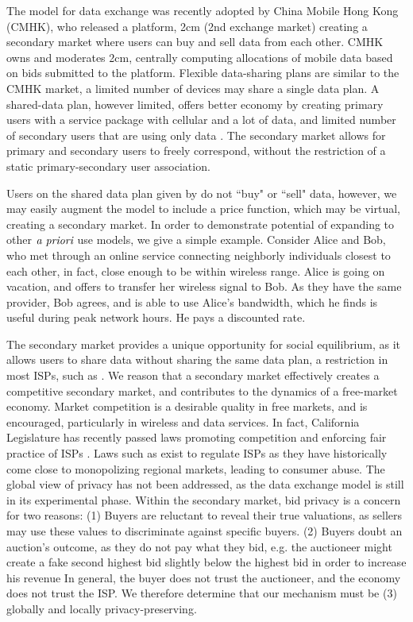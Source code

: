 The model for data exchange was recently adopted by China Mobile Hong Kong
(CMHK), who released a platform, 2cm (2nd exchange market) creating a secondary
market where users can buy and sell data from each other.
CMHK owns and moderates 2cm, centrally computing allocations of mobile data
based on bids submitted to the platform.
Flexible data-sharing
plans are similar to the CMHK market, a limited number of devices may
share a single data plan. A shared-data plan, however limited, offers better economy
by creating primary users with a service package with cellular and a lot of data, and
limited number of secondary users that are using only data \cite{att}.
The secondary market allows for primary and secondary users to freely correspond,
without the restriction of a static primary-secondary user association.

Users on the shared data plan given by \cite{att} do not ``buy" or ``sell"
data, however, we may easily augment the model to include a price function,
which may be virtual, creating a secondary market.
In order to demonstrate potential of expanding to other $\emph{a priori}$ use
models, we give a simple example. Consider Alice and Bob, who met through an online service connecting neighborly
individuals closest to each other, in fact, close enough to be within wireless
range. Alice is going on vacation, and offers to transfer her wireless signal to
Bob. As they have the same provider, Bob agrees, and is able to use Alice's
bandwidth, which he finds is useful during peak network
hours. He pays a discounted rate.

The secondary market provides a unique opportunity for social equilibrium, as it
allows users to share data without sharing the same data plan, a restriction in
most ISPs, such as \cite{att}. We reason that a secondary market effectively creates a competitive secondary market, and contributes to the
dynamics of a free-market economy. Market competition is a desirable quality in
free markets, and is encouraged, particularly in wireless and data services. In
fact, California Legislature has recently passed laws promoting
competition and enforcing fair practice of ISPs \cite{cabill}.
Laws such as \cite{fedbill} exist to
regulate ISPs as they have historically come close to monopolizing regional
markets, leading to consumer abuse.
The global view of privacy has not been addressed, as the data exchange model is still
in its experimental phase.
Within the secondary market, bid privacy is a concern for two reasons: (1) Buyers are reluctant to
reveal their true valuations, as sellers may use these values to discriminate
against specific buyers. (2) Buyers doubt an auction's outcome, as they do
not pay what they bid, e.g. the auctioneer might create a fake
second highest bid slightly below the highest bid in order to increase his revenue
In general, the buyer does not trust the auctioneer, and the economy does not
trust the ISP.
We therefore determine that our mechanism must be (3) globally and locally privacy-preserving. 


